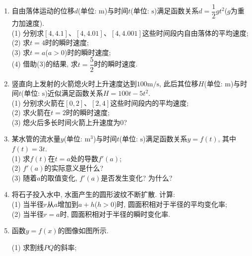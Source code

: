 \documentclass[10pt,a4paper]{article}
\begin{document}
\begin{enumerate}[1.]

\item 自由落体运动的位移$d$(单位: $\text{m}$)与时间$t$(单位: $\text{s}$)满足函数关系$d=\dfrac 12gt^2$($g$为重力加速度).\\
(1) 分别求$[4,4.1]$、$[4,4.01]$、$[4,4.001]$这些时间段内自由落体的平均速度;\\
(2) 求$t=4$时的瞬时速度;\\
(3) 求$t=a$($a>0$)时的瞬时速度;\\
(4) 借助(3)的结果, 求$t=\dfrac 52$时的瞬时速度.
\item 竖直向上发射的火箭熄火时上升速度达到$100\text{m}/\text{s}$, 此后其位移$H$(单位: $\text{m}$)与时间$t$(单位: $\text{s}$)近似满足函数关系$H=100t-5t^2$.\\
(1) 分别求火箭在$[0, 2]$、$[2, 4]$这些时间段内的平均速度;\\
(2) 求火箭在$t=2$时的瞬时速度;\\
(3) 熄火后多长时间火箭上升速度为$0$?
\item 某水管的流水量$y$(单位: $\text{m}^3$)与时间$t$(单位: $\text{s}$)满足函数关系$y=f(t)$, 其中$f(t)=3t$.\\
(1) 求$f(t)$在$t=a$处的导数$f'(a)$;\\
(2) $f'(a)$的实际意义是什么?\\
(3) 随着$a$的取值变化, $f'(a)$是否发生变化? 为什么?
\item 将石子投入水中, 水面产生的圆形波纹不断扩散. 计算:\\
(1) 当半径$r$从$a$增加到$a+h$($h>0$)时, 圆面积相对于半径的平均变化率;\\
(2) 当半径$r=a$时, 圆面积相对于半径的瞬时变化率. 
\item 函数$y=f(x)$的图像如图所示.
\begin{center}
\end{center}
(1) 求割线$PQ$的斜率;\\

\end{enumerate}
\end{document}
